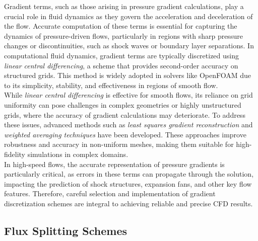 \documentclass[a5paper]{sapthesis}
\begin{document}
	Gradient terms, such as those arising in pressure gradient calculations, play a crucial role in fluid dynamics as they govern the acceleration and deceleration of the flow. Accurate computation of these terms is essential for capturing the dynamics of pressure-driven flows, particularly in regions with sharp pressure changes or discontinuities, such as shock waves or boundary layer separations. In computational fluid dynamics, gradient terms are typically discretized using \textit{linear central differencing}, a scheme that provides second-order accuracy on structured grids. This method is widely adopted in solvers like OpenFOAM due to its simplicity, stability, and effectiveness in regions of smooth flow.
	\\
	While \textit{linear central differencing} is effective for smooth flows, its reliance on grid uniformity can pose challenges in complex geometries or highly unstructured grids, where the accuracy of gradient calculations may deteriorate. To address these issues, advanced methods such as \textit{least squares gradient reconstruction} and \textit{weighted averaging techniques} have been developed. These approaches improve robustness and accuracy in non-uniform meshes, making them suitable for high-fidelity simulations in complex domains. 
	\\
	In high-speed flows, the accurate representation of pressure gradients is particularly critical, as errors in these terms can propagate through the solution, impacting the prediction of shock structures, expansion fans, and other key flow features. Therefore, careful selection and implementation of gradient discretization schemes are integral to achieving reliable and precise CFD results.
	
	\subsection{Flux Splitting Schemes}
	
\end{document}
